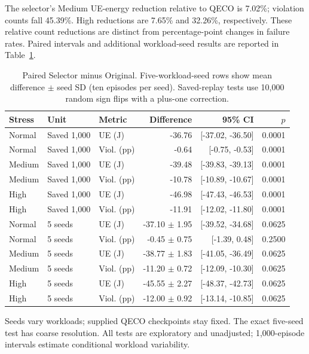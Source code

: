 \documentclass[conference]{IEEEtran}
\begin{document}
The selector's Medium UE-energy reduction relative to QECO is 7.02\%; violation counts fall 45.39\%. High reductions are 7.65\% and 32.26\%, respectively. These relative count reductions are distinct from percentage-point changes in failure rates. Paired intervals and additional workload-seed results are reported in Table~\ref{tab:mainstats}.
\begin{table}[t]
\centering\footnotesize
\caption{Paired Selector minus Original. Five-workload-seed rows show mean difference $\pm$ seed SD (ten episodes per seed). Saved-replay tests use 10,000 random sign flips with a plus-one correction.}
\label{tab:mainstats}
\begin{tabular}{@{}lllrrr@{}}\toprule
Stress & Unit & Metric & Difference & 95\% CI & $p$\\\midrule
Normal & Saved 1,000 & UE (J) & -36.76 & [-37.02, -36.50] & 0.0001 \\
Normal & Saved 1,000 & Viol. (pp) & -0.64 & [-0.75, -0.53] & 0.0001 \\
Medium & Saved 1,000 & UE (J) & -39.48 & [-39.83, -39.13] & 0.0001 \\
Medium & Saved 1,000 & Viol. (pp) & -10.78 & [-10.89, -10.67] & 0.0001 \\
High & Saved 1,000 & UE (J) & -46.98 & [-47.43, -46.53] & 0.0001 \\
High & Saved 1,000 & Viol. (pp) & -11.91 & [-12.02, -11.80] & 0.0001 \\
Normal & 5 seeds & UE (J) & -37.10 $\pm$ 1.95 & [-39.52, -34.68] & 0.0625 \\
Normal & 5 seeds & Viol. (pp) & -0.45 $\pm$ 0.75 & [-1.39, 0.48] & 0.2500 \\
Medium & 5 seeds & UE (J) & -38.77 $\pm$ 1.83 & [-41.05, -36.49] & 0.0625 \\
Medium & 5 seeds & Viol. (pp) & -11.20 $\pm$ 0.72 & [-12.09, -10.30] & 0.0625 \\
High & 5 seeds & UE (J) & -45.55 $\pm$ 2.27 & [-48.37, -42.73] & 0.0625 \\
High & 5 seeds & Viol. (pp) & -12.00 $\pm$ 0.92 & [-13.14, -10.85] & 0.0625 \\
\bottomrule\end{tabular}

\par\smallskip\begin{minipage}{\textwidth}\footnotesize Seeds vary workloads; supplied QECO checkpoints stay fixed. The exact five-seed test has coarse resolution. All tests are exploratory and unadjusted; 1,000-episode intervals estimate conditional workload variability.\end{minipage}
\end{table}
\end{document}

